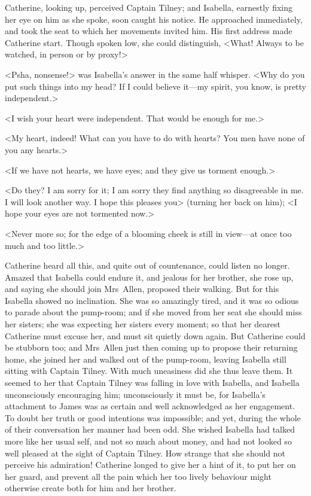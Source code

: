  Catherine, looking up, perceived Captain Tilney; and Isabella, earnestly fixing her eye on him as she spoke, soon caught his notice. He approached immediately, and took the seat to which her movements invited him. His first address made Catherine start. Though spoken low, she could distinguish, <What! Always to be watched, in person or by proxy!> 

 <Psha, nonsense!> was Isabella's answer in the same half whisper. <Why do you put such things into my head? If I could believe it—my spirit, you know, is pretty independent.> 

 <I wish your heart were independent. That would be enough for me.> 

 <My heart, indeed! What can you have to do with hearts? You men have none of you any hearts.> 

 <If we have not hearts, we have eyes; and they give us torment enough.> 

 <Do they? I am sorry for it; I am sorry they find anything so disagreeable in me. I will look another way. I hope this pleases you> (turning her back on him); <I hope your eyes are not tormented now.> 

 <Never more so; for the edge of a blooming cheek is still in view—at once too much and too little.> 

 Catherine heard all this, and quite out of countenance, could listen no longer. Amazed that Isabella could endure it, and jealous for her brother, she rose up, and saying she should join Mrs~Allen, proposed their walking. But for this Isabella showed no inclination. She was so amazingly tired, and it was so odious to parade about the pump-room; and if she moved from her seat she should miss her sisters; she was expecting her sisters every moment; so that her dearest Catherine must excuse her, and must sit quietly down again. But Catherine could be stubborn too; and Mrs~Allen just then coming up to propose their returning home, she joined her and walked out of the pump-room, leaving Isabella still sitting with Captain Tilney. With much uneasiness did she thus leave them. It seemed to her that Captain Tilney was falling in love with Isabella, and Isabella unconsciously encouraging him; unconsciously it must be, for Isabella's attachment to James was as certain and well acknowledged as her engagement. To doubt her truth or good intentions was impossible; and yet, during the whole of their conversation her manner had been odd. She wished Isabella had talked more like her usual self, and not so much about money, and had not looked so well pleased at the sight of Captain Tilney. How strange that she should not perceive his admiration! Catherine longed to give her a hint of it, to put her on her guard, and prevent all the pain which her too lively behaviour might otherwise create both for him and her brother. 

